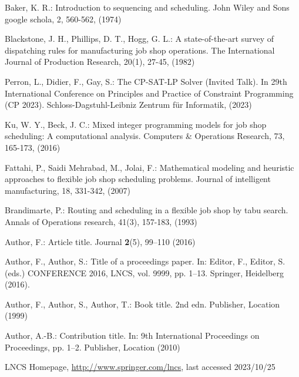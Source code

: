 \begin{thebibliography}{8}
	Baker, K. R.: Introduction to sequencing and scheduling. John Wiley and Sons google schola, 2, 560-562, (1974)
	
	Blackstone, J. H., Phillips, D. T., Hogg, G. L.: A state-of-the-art survey of dispatching rules for manufacturing job shop operations. The International Journal of Production Research, 20(1), 27-45, (1982)
	
	Perron, L., Didier, F., Gay, S.: The CP-SAT-LP Solver (Invited Talk). In 29th International Conference on Principles and Practice of Constraint Programming (CP 2023). Schloss-Dagstuhl-Leibniz Zentrum für Informatik, (2023)
	
	Ku, W. Y., Beck, J. C.: Mixed integer programming models for job shop scheduling: A computational analysis. Computers \& Operations Research, 73, 165-173, (2016)
	
	Fattahi, P., Saidi Mehrabad, M., Jolai, F.: Mathematical modeling and heuristic approaches to flexible job shop scheduling problems. Journal of intelligent manufacturing, 18, 331-342, (2007)
	
	Brandimarte, P.: Routing and scheduling in a flexible job shop by tabu search. Annals of Operations research, 41(3), 157-183, (1993)
	
	
	Author, F.: Article title. Journal \textbf{2}(5), 99--110 (2016)
	
	Author, F., Author, S.: Title of a proceedings paper. In: Editor,
	F., Editor, S. (eds.) CONFERENCE 2016, LNCS, vol. 9999, pp. 1--13.
	Springer, Heidelberg (2016). 
	
	Author, F., Author, S., Author, T.: Book title. 2nd edn. Publisher,
	Location (1999)
	
	Author, A.-B.: Contribution title. In: 9th International Proceedings
	on Proceedings, pp. 1--2. Publisher, Location (2010)
	
	LNCS Homepage, \url{http://www.springer.com/lncs}, last accessed 2023/10/25
\end{thebibliography}